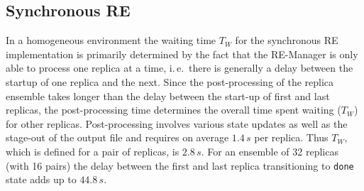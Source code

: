 \documentclass{rspublic}
\newcommand{\alnote}[1]{ {\textcolor{blue} { ***andre: #1 }}}
\newcommand{\athotanote}[1]{ {\textcolor{green} { ***athota: #1 }}}
\newcommand{\alnote}[1]{}
\newcommand{\athotanote}[1]{}
\begin{document}
\subsection{Synchronous RE}
\label{subsec:sync}


In a homogeneous environment the waiting time $T_{W}$ for the
synchronous RE implementation is primarily determined by the fact that
the RE-Manager is only able to process one replica at a time, i.\,e.\
there is generally a delay between the startup of one replica and the
next. Since the post-processing of the replica ensemble takes longer
than the delay between the start-up of first and last replicas, the
post-processing time determines the overall time spent waiting ($T_W$)
for other replicas.  Post-processing involves various state updates as
well as the stage-out of the output file and requires on average
$1.4\,s$ per replica.  Thus $T_{W}$, which is defined for a pair of
replicas, is $2.8\,s$.  For an ensemble of 32 replicas (with 16 pairs)
the delay between the first and last replica transitioning to
\texttt{done} state adds up to $44.8\,s$.

\end{document}

